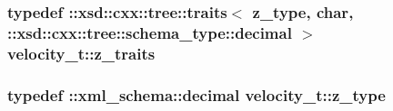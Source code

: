 \hypertarget{classvelocity__t_a7231515c9a7c3d2bbab96bccc8b12c6e}{
\subsubsection[{z\-\_\-traits}]{\setlength{\rightskip}{0pt plus 5cm}typedef \-::xsd\-::cxx\-::tree\-::traits$<$ {\bf z\-\_\-type}, char, \-::xsd\-::cxx\-::tree\-::schema\-\_\-type\-::decimal $>$ {\bf velocity\-\_\-t\-::z\-\_\-traits}}}\label{classvelocity__t_a7231515c9a7c3d2bbab96bccc8b12c6e}
\hypertarget{classvelocity__t_a0268003d7669eaa63abdcd4df2933316}{
\subsubsection[{z\-\_\-type}]{\setlength{\rightskip}{0pt plus 5cm}typedef \-::{\bf xml\-\_\-schema\-::decimal} {\bf velocity\-\_\-t\-::z\-\_\-type}}}\label{classvelocity__t_a0268003d7669eaa63abdcd4df2933316}


